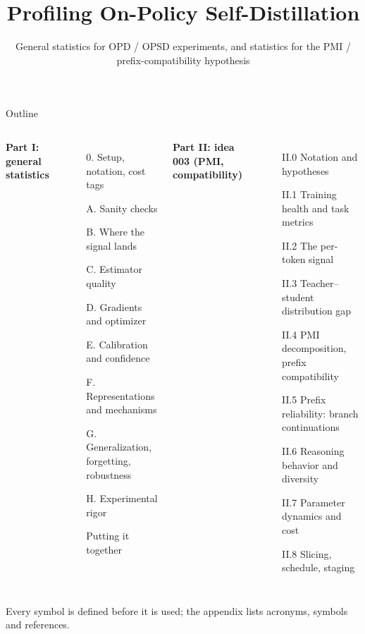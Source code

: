 \documentclass[aspectratio=169,11pt]{beamer}
\title{Profiling On-Policy Self-Distillation}
\subtitle{General statistics for OPD / OPSD experiments, and statistics for the PMI / prefix-compatibility hypothesis}
\author{}
\date{}
\newcommand{\gnote}[1]{{\scriptsize\color{cGray}#1}}
\begin{document}
\maketitle

\begin{frame}{Outline}
\begin{columns}[T]
\textbf{Part I: general statistics}\\[2pt]
\small
\begin{enumerate}
  \setlength\itemsep{0pt}
  \item[0.] Setup, notation, cost tags
  \item[A.] Sanity checks
  \item[B.] Where the signal lands
  \item[C.] Estimator quality
  \item[D.] Gradients and optimizer
  \item[E.] Calibration and confidence
  \item[F.] Representations and mechanisms
  \item[G.] Generalization, forgetting, robustness
  \item[H.] Experimental rigor
  \item[] Putting it together
\end{enumerate}
\textbf{Part II: idea 003 (PMI, compatibility)}\\[2pt]
\small
\begin{enumerate}
  \setlength\itemsep{0pt}
  \item[II.0] Notation and hypotheses
  \item[II.1] Training health and task metrics
  \item[II.2] The per-token signal
  \item[II.3] Teacher--student distribution gap
  \item[II.4] PMI decomposition, prefix compatibility
  \item[II.5] Prefix reliability: branch continuations
  \item[II.6] Reasoning behavior and diversity
  \item[II.7] Parameter dynamics and cost
  \item[II.8] Slicing, schedule, staging
\end{enumerate}
\end{columns}
\gnote{Every symbol is defined before it is used; the appendix lists acronyms, symbols and references.}
\end{frame}
\end{document}
